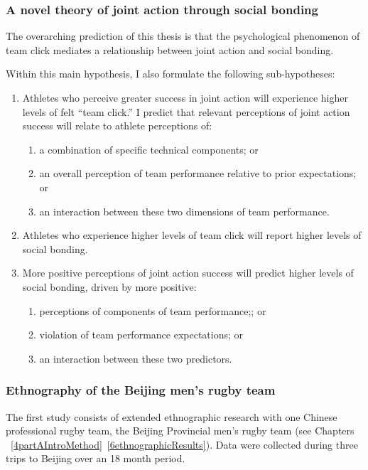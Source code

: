 \begin{CJK}{UTF8}{gbsn}
\subsubsection{A novel theory of joint action through social bonding}




    The overarching prediction of this thesis is that the psychological phenomenon of team click mediates a relationship between joint action and social bonding.

    Within this main hypothesis, I also formulate the following sub-hypotheses:
    \begin{enumerate}
      \item Athletes who perceive greater success in joint action will experience higher levels of felt ``team click.'' I predict that relevant perceptions of joint action success will relate to athlete perceptions of:
        \begin{enumerate}
          \item a combination of specific technical components; or
          \item an overall perception of team performance relative to prior expectations; or
          \item an interaction between these two dimensions of team performance.
        \end{enumerate}
      \item Athletes who experience higher levels of team click will report higher levels of social bonding.
      \item More positive perceptions of joint action success will predict higher levels of social bonding, driven by more positive:
      \begin{enumerate}
        \item perceptions of components of team performance;; or
        \item violation of team performance expectations; or
        \item an interaction between these two predictors.
      \end{enumerate}
    \end{enumerate}









\subsubsection{Ethnography of the Beijing men's rugby team}
  The first study consists of extended ethnographic research with one Chinese professional rugby team, the Beijing Provincial men's rugby team (see Chapters ~\ref{4partAIntroMethod}\nobreakdash~\ref{6ethnographicResults}).  Data were collected during three trips to Beijing over an 18 month period.


\end{CJK}
